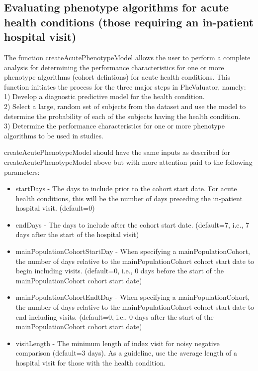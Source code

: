 \documentclass[
]{article}
\providecommand{\tightlist}{%
  \setlength{\itemsep}{0pt}\setlength{\parskip}{0pt}}
\begin{document}
\hypertarget{evaluating-phenotype-algorithms-for-acute-health-conditions-those-requiring-an-in-patient-hospital-visit}{%
\subsection{Evaluating phenotype algorithms for acute health conditions
(those requiring an in-patient hospital
visit)}\label{evaluating-phenotype-algorithms-for-acute-health-conditions-those-requiring-an-in-patient-hospital-visit}}

The function createAcutePhenotypeModel allows the user to perform a
complete analysis for determining the performance characteristics for
one or more phenotype algorithms (cohort defintions) for acute health
conditions. This function initiates the process for the three major
steps in PheValuator, namely:\\
1) Develop a diagnostic predictive model for the health condition.\\
2) Select a large, random set of subjects from the dataset and use the
model to determine the probability of each of the subjects having the
health condition.\\
3) Determine the performance characteristics for one or more phenotype
algorithms to be used in studies.

createAcutePhenotypeModel should have the same inputs as described for
createAcutePhenotypeModel above but with more attention paid to the
following parameters:

\begin{itemize}
\tightlist
\item
  startDays - The days to include prior to the cohort start date. For
  acute health conditions, this will be the number of days preceding the
  in-patient hospital visit. (default=0)
\item
  endDays - The days to include after the cohort start date. (default=7,
  i.e., 7 days after the start of the hospital visit)
\item
  mainPopulationCohortStartDay - When specifying a mainPopulationCohort,
  the number of days relative to the mainPopulationCohort cohort start
  date to begin including visits. (default=0, i.e., 0 days before the
  start of the mainPopulationCohort cohort start date)
\item
  mainPopulationCohortEndtDay - When specifying a mainPopulationCohort,
  the number of days relative to the mainPopulationCohort cohort start
  date to end including visits. (default=0, i.e., 0 days after the start
  of the mainPopulationCohort cohort start date)
\item
  visitLength - The minimum length of index visit for noisy negative
  comparison (default=3 days). As a guideline, use the average length of
  a hospital visit for those with the health condition.
\end{itemize}
\end{document}
